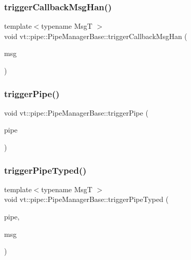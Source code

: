 \subsubsection{\texorpdfstring{trigger\+Callback\+Msg\+Han()}{triggerCallbackMsgHan()}}
{\footnotesize\ttfamily template$<$typename MsgT $>$ \\
void vt\+::pipe\+::\+Pipe\+Manager\+Base\+::trigger\+Callback\+Msg\+Han (\begin{DoxyParamCaption}\item[{MsgT $\ast$}]{msg }\end{DoxyParamCaption})\hspace{0.3cm}{\ttfamily [static]}}

\mbox{\label{structvt_1_1pipe_1_1_pipe_manager_base_a32f82a02196fe42e98ae3b628b73ae6d}} 
\subsubsection{\texorpdfstring{trigger\+Pipe()}{triggerPipe()}}
{\footnotesize\ttfamily void vt\+::pipe\+::\+Pipe\+Manager\+Base\+::trigger\+Pipe (\begin{DoxyParamCaption}\item[{\hyperlink{namespacevt_ac9852acda74d1896f48f406cd72c7bd3}{Pipe\+Type} const \&}]{pipe }\end{DoxyParamCaption})\hspace{0.3cm}{\ttfamily [protected]}}

\mbox{\label{structvt_1_1pipe_1_1_pipe_manager_base_a34492ef027a92525ca5acc4e86b360ce}} 
\subsubsection{\texorpdfstring{trigger\+Pipe\+Typed()}{triggerPipeTyped()}}
{\footnotesize\ttfamily template$<$typename MsgT $>$ \\
void vt\+::pipe\+::\+Pipe\+Manager\+Base\+::trigger\+Pipe\+Typed (\begin{DoxyParamCaption}\item[{\hyperlink{namespacevt_ac9852acda74d1896f48f406cd72c7bd3}{Pipe\+Type} const \&}]{pipe,  }\item[{MsgT $\ast$}]{msg }\end{DoxyParamCaption})\hspace{0.3cm}{\ttfamily [protected]}}

